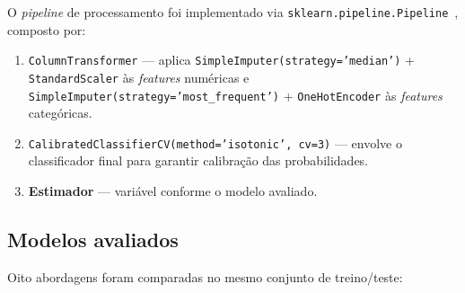 O \emph{pipeline} de processamento foi implementado via \texttt{sklearn.pipeline.Pipeline}~\cite{pedregosa2011scikit}, composto por:

\begin{enumerate}
  \item \texttt{ColumnTransformer} --- aplica \texttt{SimpleImputer(strategy='median')} + \texttt{StandardScaler} às \emph{features} numéricas e \texttt{SimpleImputer(strategy='most\_frequent')} + \texttt{OneHotEncoder} às \emph{features} categóricas.
  \item \texttt{CalibratedClassifierCV(method='isotonic', cv=3)} --- envolve o classificador final para garantir calibração das probabilidades.
  \item \textbf{Estimador} --- variável conforme o modelo avaliado.
\end{enumerate}

\subsection{Modelos avaliados}

Oito abordagens foram comparadas no mesmo conjunto de treino/teste:

